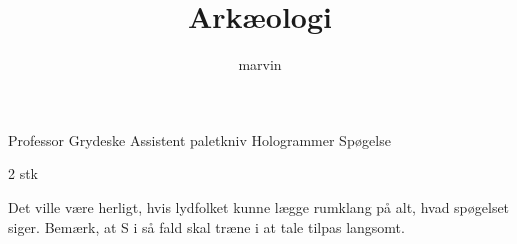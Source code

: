 \documentclass[danish]{article}
\title{Arkæologi}
\author{marvin}
\begin{document}
\maketitle

\begin{roles}
   Professor Grydeske
   Assistent paletkniv
   Hologrammer
   Spøgelse
\end{roles}

\begin{props}
   2 stk
\end{props}

Det ville være herligt, hvis lydfolket kunne lægge rumklang på alt, hvad
spøgelset siger. Bemærk, at S i så fald skal træne i at tale tilpas langsomt.
\end{document}
